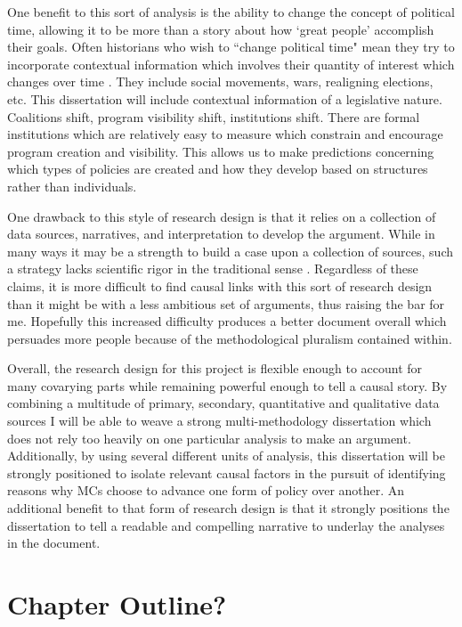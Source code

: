 \documentclass[12pt]{article}
\begin{document}
One benefit to this sort of analysis is the ability to change the concept of political time, allowing it to be more than a story about how `great people' accomplish their goals. Often historians who wish to ``change political time" mean they try to incorporate contextual information which involves their quantity of interest which changes over time \citep{zelizer2002}. They include social movements, wars, realigning elections, etc. This dissertation will include contextual information of a legislative nature. Coalitions shift, program visibility shift, institutions shift. There are formal institutions which are relatively easy to measure which constrain and encourage program creation and visibility. This allows us to make predictions concerning which types of policies are created and how they develop based on structures rather than individuals. 

One drawback to this style of research design is that it relies on a collection of data sources, narratives, and interpretation to develop the argument. While in many ways it may be a strength to build a case upon a collection of sources, such a strategy lacks scientific rigor in the traditional sense \citep{king1994}. Regardless of these claims, it is more difficult to find causal links with this sort of research design than it might be with a less ambitious set of arguments, thus raising the bar for me. Hopefully this increased difficulty produces a better document overall which persuades more people because of the methodological pluralism contained within.

Overall, the research design for this project is flexible enough to account for many covarying parts while remaining powerful enough to tell a causal story. By combining a multitude of primary, secondary, quantitative and qualitative data sources I will be able to weave a strong multi-methodology dissertation which does not rely too heavily on one particular analysis to make an argument. Additionally, by using several different units of analysis, this dissertation will be strongly positioned to isolate relevant causal factors in the pursuit of identifying reasons why MCs choose to advance one form of policy over another. An additional benefit to that form of research design is that it strongly positions the dissertation to tell a readable and compelling narrative to underlay the analyses in the document. 

\section{Chapter Outline?}


\newpage
    {}


\end{document}
